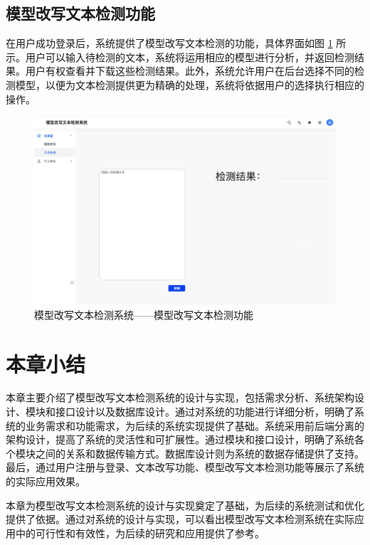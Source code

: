 \subsection{模型改写文本检测功能}

在用户成功登录后，系统提供了模型改写文本检测的功能，具体界面如图 \ref{fig:sys-detect} 所示。用户可以输入待检测的文本，系统将运用相应的模型进行分析，并返回检测结果。用户有权查看并下载这些检测结果。此外，系统允许用户在后台选择不同的检测模型，以便为文本检测提供更为精确的处理，系统将依据用户的选择执行相应的操作。

\begin{figure}[htb]
    \centering
    \includegraphics[width=\textwidth]{figures/sys-detect.jpg}
    \caption{模型改写文本检测系统——模型改写文本检测功能}
    \label{fig:sys-detect}
\end{figure}

\section{本章小结}
\label{sec:sys-conclusion}

本章主要介绍了模型改写文本检测系统的设计与实现，包括需求分析、系统架构设计、模块和接口设计以及数据库设计。通过对系统的功能进行详细分析，明确了系统的业务需求和功能需求，为后续的系统实现提供了基础。系统采用前后端分离的架构设计，提高了系统的灵活性和可扩展性。通过模块和接口设计，明确了系统各个模块之间的关系和数据传输方式。数据库设计则为系统的数据存储提供了支持。最后，通过用户注册与登录、文本改写功能、模型改写文本检测功能等展示了系统的实际应用效果。

本章为模型改写文本检测系统的设计与实现奠定了基础，为后续的系统测试和优化提供了依据。通过对系统的设计与实现，可以看出模型改写文本检测系统在实际应用中的可行性和有效性，为后续的研究和应用提供了参考。